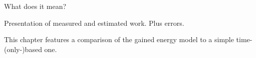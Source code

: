 \label{sec:evaluation}

What does it mean?



\label{sec:error}

Presentation of measured and estimated work. Plus errors.


\label{sec:time-based}

This chapter features a comparison of the gained energy model to a simple
time-(only-)based one.
